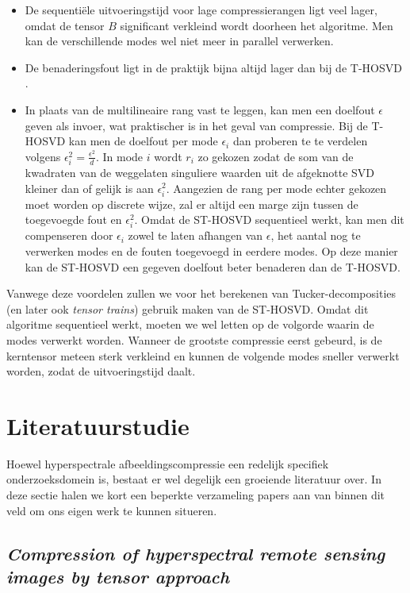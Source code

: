 \begin{itemize}
\item De sequenti\"ele uitvoeringstijd voor lage compressierangen ligt veel lager, omdat de tensor $B$ significant verkleind wordt doorheen het algoritme. Men kan de verschillende modes wel niet meer in parallel verwerken.
\item De benaderingsfout ligt in de praktijk bijna altijd lager dan bij de T-HOSVD \cite{ref:st_hosvd}.
\item In plaats van de multilineaire rang vast te leggen, kan men een doelfout $\epsilon$ geven als invoer, wat praktischer is in het geval van compressie. Bij de T-HOSVD kan men de doelfout per mode $\epsilon_i$ dan proberen te te verdelen volgens $\epsilon_i^2 = \frac{\epsilon^2}{d}$. In mode $i$ wordt $r_i$ zo gekozen zodat de som van de kwadraten van de weggelaten singuliere waarden uit de afgeknotte SVD kleiner dan of gelijk is aan $\epsilon_i^2$. Aangezien de rang per mode echter gekozen moet worden op discrete wijze, zal er altijd een marge zijn tussen de toegevoegde fout en $\epsilon_i^2$. Omdat de ST-HOSVD sequentieel werkt, kan men dit compenseren door $\epsilon_i$ zowel te laten afhangen van $\epsilon$, het aantal nog te verwerken modes en de fouten toegevoegd in eerdere modes. Op deze manier kan de ST-HOSVD een gegeven doelfout beter benaderen dan de T-HOSVD.
\end{itemize}

Vanwege deze voordelen zullen we voor het berekenen van Tucker-decomposities (en later ook \textit{tensor trains}) gebruik maken van de ST-HOSVD. Omdat dit algoritme sequentieel werkt, moeten we wel letten op de volgorde waarin de modes verwerkt worden. Wanneer de grootste compressie eerst gebeurd, is de kerntensor meteen sterk verkleind en kunnen de volgende modes sneller verwerkt worden, zodat de uitvoeringstijd daalt.

\section{Literatuurstudie}

Hoewel hyperspectrale afbeeldingscompressie een redelijk specifiek onderzoeksdomein is, bestaat er wel degelijk een groeiende literatuur over. In deze sectie halen we kort een beperkte verzameling papers aan van binnen dit veld om ons eigen werk te kunnen situeren.

\subsection{\textit{Compression of hyperspectral remote sensing images by tensor approach}}

